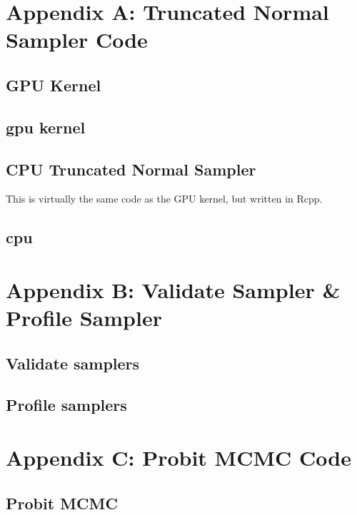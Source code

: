 \documentclass[9pt]{amsart}
\newcommand{\prettycode}[2]{
  \hrulefill
  \subsection*{#1}
  
  \vspace{2em}
}
\begin{document}
\newpage

\section{Appendix A: Truncated Normal Sampler Code}

\subsection{GPU Kernel}
\prettycode{gpu kernel}{../rtruncnorm.cu}
\subsection{CPU Truncated Normal Sampler}
This is virtually the same code as the GPU kernel, but written in Rcpp.
\prettycode{cpu}{../rtruncnorm_cpu.cpp}


\section{Appendix B: Validate Sampler \& Profile Sampler}
\subsection{Validate samplers}
\prettycode{}{../verify_rtruncnorm.r}
\subsection{Profile samplers}
\prettycode{}{../q1e_profile_samplers.r}
\section{Appendix C: Probit MCMC Code}
\subsection{Probit MCMC}
\prettycode{}{../probit_mcmc.r}
\end{document}
